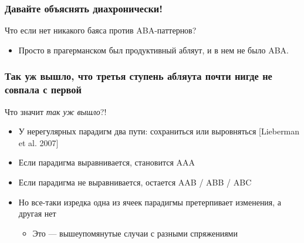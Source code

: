 \documentclass[9pt, t]{beamer}
\begin{document}
\begin{frame}
    \frametitle{Давайте объяснять диахронически!}

    Что если нет никакого баяса против ABA-паттернов?

    \begin{itemize}
        \item Просто в прагерманском был продуктивный абляут, и в нем не было ABA.
        

    \end{itemize}
\end{frame}

\begin{frame}
    \frametitle{Так уж вышло, что третья ступень абляута почти нигде не совпала с первой}

    Что значит \textit{так уж вышло}?!

    \begin{itemize}
        \item У нерегулярных парадигм два пути: сохраниться или выровняться [Lieberman et al. 2007]
        \pause

        \item Если парадигма выравнивается, становится AAA
        \item Если парадигма не выравнивается, остается AAB / ABB / ABC
        
        \pause
        \item Но все-таки изредка одна из ячеек парадигмы претерпивает изменения, а другая нет
        \begin{itemize}
            \item Это — вышеупомянутые случаи с разными спряжениями
        \end{itemize}
    \end{itemize}
\end{frame}
\end{document}

